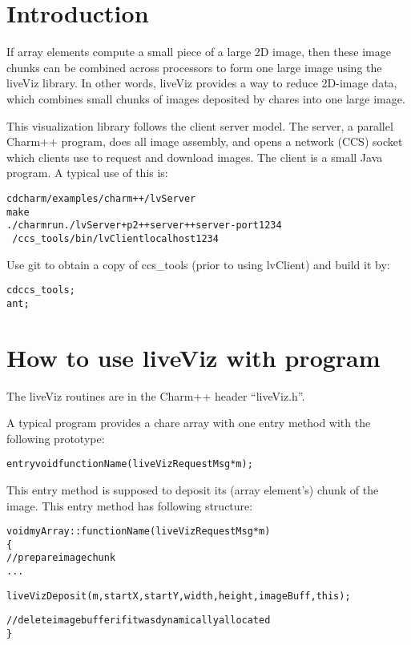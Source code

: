 \section{Introduction}

If array elements compute a small piece of a large 2D image, then these 
image chunks can be combined across processors to form one large 
image using the liveViz library. In other 
words, liveViz provides a way to reduce 2D-image data, which 
combines small chunks of images deposited by chares into one large image.

This visualization library follows the client server model.
The server, a parallel Charm++ program, does all image assembly, 
and opens a network (CCS) socket which clients use to request and 
download images.  The client is a small Java program.
A typical use of this is:
\begin{alltt}
	cd charm/examples/charm++/lvServer
	make
	./charmrun ./lvServer +p2 ++server ++server-port 1234 
	~/ccs\_tools/bin/lvClient localhost 1234
\end{alltt}

Use git to obtain a copy of ccs\_tools (prior to using lvClient)
 and build it by:

\begin{alltt}
      cd ccs\_tools;
      ant;
\end{alltt}



\section{How to use liveViz with \charmpp{} program}

The liveViz routines are in the Charm++ header ``liveViz.h''.

A typical program provides a chare array with one entry method 
with the following prototype:

\begin{alltt}
  entry void functionName(liveVizRequestMsg *m);
\end{alltt}

This entry method is supposed to deposit its (array element's) chunk of 
the image. This entry method has following structure:

\begin{alltt}
  void myArray::functionName (liveVizRequestMsg *m)
  \{
    // prepare image chunk
       ...

    liveVizDeposit (m, startX, startY, width, height, imageBuff, this);

    // delete image buffer if it was dynamically allocated
  \}
\end{alltt}

